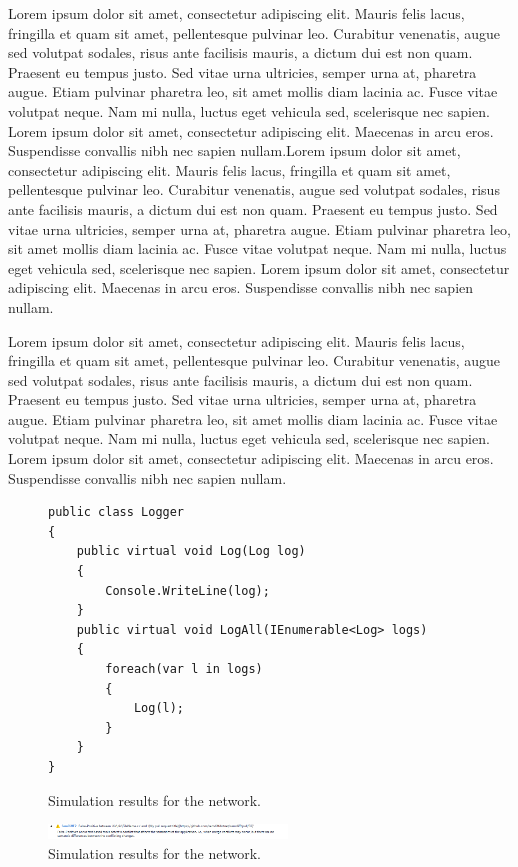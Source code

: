 \documentclass[draftclsnofoot,onecolumn]{IEEEtran}
\begin{document}
Lorem ipsum dolor sit amet, consectetur adipiscing elit. Mauris felis lacus, fringilla et quam sit amet, pellentesque pulvinar leo. Curabitur venenatis, augue sed volutpat sodales, risus ante facilisis mauris, a dictum dui est non quam. Praesent eu tempus justo. Sed vitae urna ultricies, semper urna at, pharetra augue. Etiam pulvinar pharetra leo, sit amet mollis diam lacinia ac. Fusce vitae volutpat neque. Nam mi nulla, luctus eget vehicula sed, scelerisque nec sapien. Lorem ipsum dolor sit amet, consectetur adipiscing elit. Maecenas in arcu eros. Suspendisse convallis nibh nec sapien nullam.Lorem ipsum dolor sit amet, consectetur adipiscing elit. Mauris felis lacus, fringilla et quam sit amet, pellentesque pulvinar leo. Curabitur venenatis, augue sed volutpat sodales, risus ante facilisis mauris, a dictum dui est non quam. Praesent eu tempus justo. Sed vitae urna ultricies, semper urna at, pharetra augue. Etiam pulvinar pharetra leo, sit amet mollis diam lacinia ac. Fusce vitae volutpat neque. Nam mi nulla, luctus eget vehicula sed, scelerisque nec sapien. Lorem ipsum dolor sit amet, consectetur adipiscing elit. Maecenas in arcu eros. Suspendisse convallis nibh nec sapien nullam.

Lorem ipsum dolor sit amet, consectetur adipiscing elit. Mauris felis lacus, fringilla et quam sit amet, pellentesque pulvinar leo. Curabitur venenatis, augue sed volutpat sodales, risus ante facilisis mauris, a dictum dui est non quam. Praesent eu tempus justo. Sed vitae urna ultricies, semper urna at, pharetra augue. Etiam pulvinar pharetra leo, sit amet mollis diam lacinia ac. Fusce vitae volutpat neque. Nam mi nulla, luctus eget vehicula sed, scelerisque nec sapien. Lorem ipsum dolor sit amet, consectetur adipiscing elit. Maecenas in arcu eros. Suspendisse convallis nibh nec sapien nullam.

\begin{figure}[!t]
\centering
\begin{lstlisting}
public class Logger
{
	public virtual void Log(Log log)
	{
		Console.WriteLine(log);
	}
	public virtual void LogAll(IEnumerable<Log> logs)
	{
		foreach(var l in logs)
		{
			Log(l);
		}
	}
}
\end{lstlisting}
\endgroup
\caption{Simulation results for the network.}
\label{fig_sim}
\end{figure}
\begingroup


\begin{figure}[!t]
\centering
\includegraphics[width=2.5in]{falsePositiveWarning}
\caption{Simulation results for the network.}
\label{fig_sim}
\end{figure}
\end{document}
